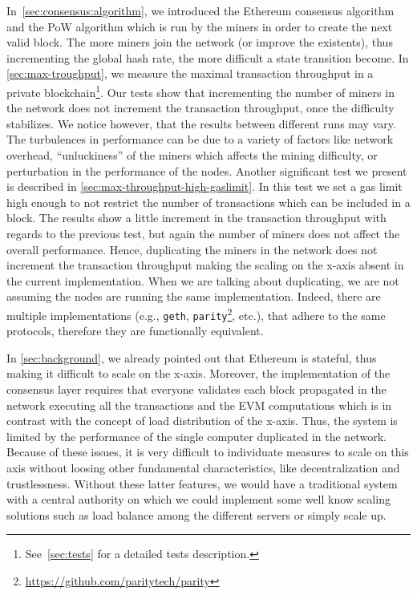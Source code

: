 In~\autoref{sec:consensus:algorithm}, we introduced the Ethereum consensus
algorithm and the PoW algorithm which is run by the miners in order to create
the next valid block. The more miners join the network (or improve the
existents), thus incrementing the global hash rate, the more difficult a state
transition become. In \autoref{sec:max-troughput}, we measure the maximal
transaction throughput in a private blockchain\footnote{See~\autoref{sec:tests}
for a detailed tests description.}. Our tests show that incrementing the number of miners in the network does not increment the transaction throughput, once the difficulty stabilizes. We notice however, that the results between different runs may vary. The turbulences in performance can be due to a variety of factors like network overhead, ``unluckiness'' of the miners which affects 
the mining difficulty, or perturbation in the performance of the nodes. Another significant test we present is described in \autoref{sec:max-throughput-high-gaslimit}. In this test we set a gas limit high enough to not restrict the number of transactions which can be
included in a block. The results show a little increment in the transaction
throughput with regards to the previous test, but again the number of miners
does not affect the overall performance. Hence, duplicating the miners in the
network does not increment the transaction throughput making the scaling on the
x-axis absent in the current implementation. When we are talking about
duplicating, we are not assuming the nodes are running the same implementation.
Indeed, there are multiple implementations (e.g.,
\texttt{geth},
\texttt{parity}\footnote{\url{https://github.com/paritytech/parity}}, etc.), that adhere to the same protocols, therefore they are functionally equivalent.

In \autoref{sec:background}, we already pointed out that Ethereum is stateful,
thus making it difficult to scale on the x-axis. Moreover, the implementation of
the consensus layer requires that everyone validates each block propagated in
the network executing all the transactions and the EVM computations which is in
contrast with the concept of load distribution of the x-axis. Thus, the system
is limited by the performance of the single computer duplicated in the network.
Because of these issues, it is very difficult to individuate measures to scale
on this axis without loosing other fundamental characteristics, like
decentralization and trustlessness. Without these latter features, we would have
a traditional system with a central authority on which we could implement some
well know scaling solutions such as load balance among the different servers or
simply scale up.

